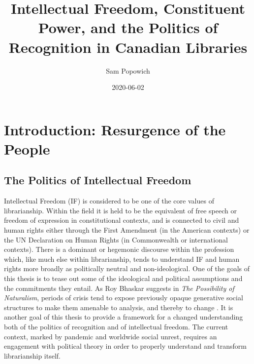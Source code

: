 \documentclass[12pt,oneside]{memoir}
\title{Intellectual Freedom, Constituent Power, and the Politics of Recognition in Canadian Libraries}
\author{Sam Popowich}
\date{2020-06-02}
\begin{document}
\maketitle
\clearpage


\tableofcontents


\newpage
\setcounter{page}{1}

\mainmatter

\chapter{Introduction: Resurgence of the People}
\label{scrivauto:5}

\section{The Politics of Intellectual Freedom}
\label{scrivauto:6}

Intellectual Freedom (IF) is considered to be one of the core values of librarianship. Within the field it is held to be the equivalent of free speech or freedom of expression in constitutional contexts, and is connected to civil and human rights either through the First Amendment (in the American contexts) or the UN Declaration on Human Rights (in Commonwealth or international contexts). There is a dominant or hegemonic discourse within the profession which, like much else within librarianship, tends to understand IF and human rights more broadly as politically neutral and non-ideological. One of the goals of this thesis is to tease out some of the ideological and political assumptions and the commitments they entail. As Roy Bhaskar suggests in \textit{The Possibility of Naturalism}, periods of crisis tend to expose previously opaque generative social structures to make them amenable to analysis, and thereby to change \cite[52]{bhaskar-1979}. It is another goal of this thesis to provide a framework for a changed understanding both of the politics of recognition and of intellectual freedom. The current context, marked by pandemic and worldwide social unrest, requires an engagement with political theory in order to properly understand and transform librarianship itself.
\end{document}
